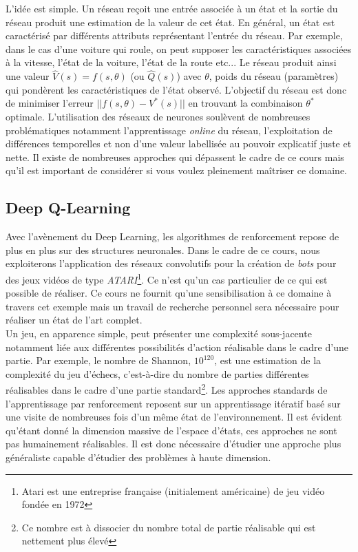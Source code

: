 \noindent L'idée est simple. Un réseau reçoit une entrée associée à un état et la sortie du réseau produit une estimation de la valeur de cet état. En général, un état est caractérisé par différents attributs représentant l'entrée du réseau. Par exemple, dans le cas d'une voiture qui roule, on peut supposer les caractéristiques associées à la vitesse, l'état de la voiture, l'état de la route etc... Le réseau produit ainsi une valeur $\hat{V}(s)=f(s,\theta)$ (ou $\hat{Q}(s)$) avec $\theta$, poids du réseau (paramètres) qui pondèrent les caractéristiques de l'état observé. L'objectif du réseau est donc de minimiser l'erreur $||f(s,\theta)-V^*(s)||$ en trouvant la combinaison $\theta^*$ optimale. L'utilisation des réseaux de neurones soulèvent de nombreuses problématiques notamment l'apprentissage \textit{online} du réseau, l'exploitation de différences temporelles et non d'une valeur labellisée au pouvoir explicatif juste et nette. Il existe de nombreuses approches qui dépassent le cadre de ce cours mais qu'il est important de considérer si vous voulez pleinement maîtriser ce domaine.

\subsection{Deep Q-Learning}
Avec l'avènement du Deep Learning, les algorithmes de renforcement repose de plus en plus sur des structures neuronales. Dans le cadre de ce cours, nous exploiterons l'application des réseaux convolutifs pour la création de \textit{bots} pour des jeux vidéos de type \textit{ATARI}\footnote{Atari est une entreprise française (initialement américaine) de jeu vidéo fondée en 1972}. Ce n'est qu'un cas particulier de ce qui est possible de réaliser. Ce cours ne fournit qu'une sensibilisation à ce domaine à travers cet exemple mais un travail de recherche personnel sera nécessaire pour réaliser un état de l'art complet.\\

\noindent Un jeu, en apparence simple, peut présenter une complexité sous-jacente notamment liée aux différentes possibilités d'action réalisable dans le cadre d'une partie. Par exemple, le nombre de Shannon, $10^{120}$, est une estimation de la complexité du jeu d'échecs, c'est-à-dire du nombre de parties différentes réalisables dans le cadre d'une partie standard\footnote{Ce nombre est à dissocier du nombre total de partie réalisable qui est nettement plus élevé}. Les approches standards de l'apprentissage par renforcement reposent sur un apprentissage itératif basé sur une visite de nombreuses fois d'un même état de l'environnement. Il est évident qu'étant donné la dimension massive de l'espace d'états, ces approches ne sont pas humainement réalisables. Il est donc nécessaire d'étudier une approche plus généraliste capable d'étudier des problèmes à haute dimension.\\

